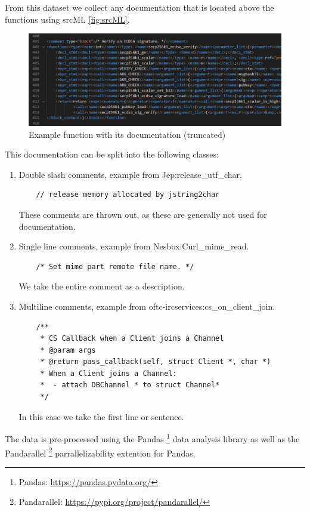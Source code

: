 From this dataset we collect any documentation that is located above the functions using srcML \ref{fig:srcML}. 
\label{fig:srcML}
\begin{figure}[H]
  \centering
  \includegraphics[width=\linewidth]{img/srcML.png}
  \caption{Example function with its documentation (truncated)}
\end{figure}

This documentation can be split into the following classes: 
\begin{enumerate}
  \item Double slash comments, example from Jep:release\_utf\_char. 
\begin{verbatim}
    // release memory allocated by jstring2char
\end{verbatim}
    These comments are thrown out, as these are generally not used for documentation.
  \item Single line comments, example from Nesbox:Curl\_mime\_read.
\begin{verbatim}
    /* Set mime part remote file name. */
\end{verbatim}
   We take the entire comment as a description.
  \item Multiline comments, example from oftc-ircservices:cs\_on\_client\_join.
\begin{verbatim}
    /**
     * CS Callback when a Client joins a Channel
     * @param args 
     * @return pass_callback(self, struct Client *, char *)
     * When a Client joins a Channel:
     *  - attach DBChannel * to struct Channel*
     */
\end{verbatim}
    In this case we take the first line or sentence.
\end{enumerate}



The data is pre-processed using the Pandas \footnote{Pandas: \url{https://pandas.pydata.org/}} data analysis library as well as the Pandarallel \footnote{Pandarallel: \url{https://pypi.org/project/pandarallel/}} parrallelizability extention for Pandas.

